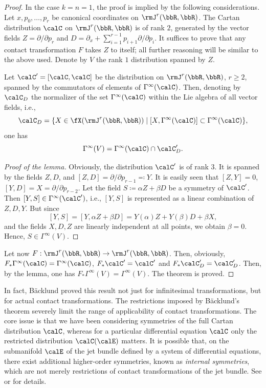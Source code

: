 \begin{proof}
    In the case $k=n=1$, the proof is implied by the following considerations. Let $x,p_0,\ldots,p_r$ be canonical coordinates on $\rmJ^r(\bbR,\bbR)$. The Cartan distribution $\calC$ on $\rmJ^r(\bbR,\bbR)$ is of rank $2$, generated by the vector fields $Z=\partial/\partial p_r$ and $D=\partial_x+\sum_{i=1}^{r-1}p_{i+1}\partial/\partial p_i$. It suffices to prove that any contact transformation $F$ takes $Z$ to itself; all further reasoning will be similar to the above used. Denote by $V$ the rank $1$ distribution spanned by $Z$.

    \begin{lem}
        Let $\calC'=[\calC,\calC]$ be the distribution on $\rmJ^r(\bbR,\bbR)$, $r\geq 2$, spanned by the commutators of elements of $\Gamma^\infty(\calC)$. Then, denoting by $\calC_D$ the normalizer of the set $\Gamma^\infty(\calC)$ within the Lie algebra of all vector fields, i.e.,
        \[\calC_D=\{X\in \fX(\rmJ^r(\bbR,\bbR))\mid [X,\Gamma^\infty(\calC)]\subset  \Gamma^\infty(\calC)\},\]
        one has 
        \[\Gamma^\infty(V)=\Gamma^\infty(\calC)\cap \calC_D'.\]
    \end{lem}
    \begin{proof}[Proof of the lemma]
        Obviously, the distribution $\calC'$ is of rank $3$. It is spanned by the fields $Z,D$, and $[Z,D]=\partial/\partial p_{r-1}\eqqcolon Y$. It is easily seen that $[Z,Y]=0$, $[Y,D]=X=\partial/\partial p_{r-2}$. Let the field $S\coloneqq \alpha Z+\beta D$ be a symmetry of $\calC'$. Then $[Y,S]\in\Gamma^\infty(\calC')$, i.e., $[Y,S]$ is represented as a linear combination of $Z,D,Y$. But since 
        \[[Y,S]=[Y,\alpha Z+\beta D]=Y(\alpha)Z+Y(\beta)D+\beta X,\]
        and the fields $X,D,Z$ are linearly independent at all points, we obtain $\beta=0$. Hence, $S\in\Gamma^\infty(V)$.
    \end{proof}
    Let now $F:\rmJ^r(\bbR,\bbR)\to \rmJ^r(\bbR,\bbR)$. Then, obviously, $F_\ast \Gamma^\infty(\calC)=\Gamma^\infty(\calC)$, $F_\ast\calC'=\calC'$ and $F_\ast \calC_D'=\calC_D'$. Then, by the lemma, one has $F_\ast \Gamma^\infty(V)=\Gamma^\infty(V)$. The theorem is proved.
\end{proof}

\begin{rem}
    In fact, B\"acklund proved this result not just for infinitesimal transformations, but for actual contact transformations. The restrictions imposed by B\"acklund's theorem severely limit the range of applicability of contact transformations. The core issue is that we have been considering symmetries of the full Cartan distribution $\calC$, whereas for a particular differential equation $\calC$ only the restricted distribution $\calC(\calE)$ matters. It is possible that, on the submanifold $\calE$ of the jet bundle defined by a system of differential equations, there exist additional higher-order symmetries, known as \emph{internal symmetries}, which are not merely restrictions of contact transformations of the jet bundle. See \cite[\S3.7]{Kras} or \cite{Olver93} for details.
\end{rem}


